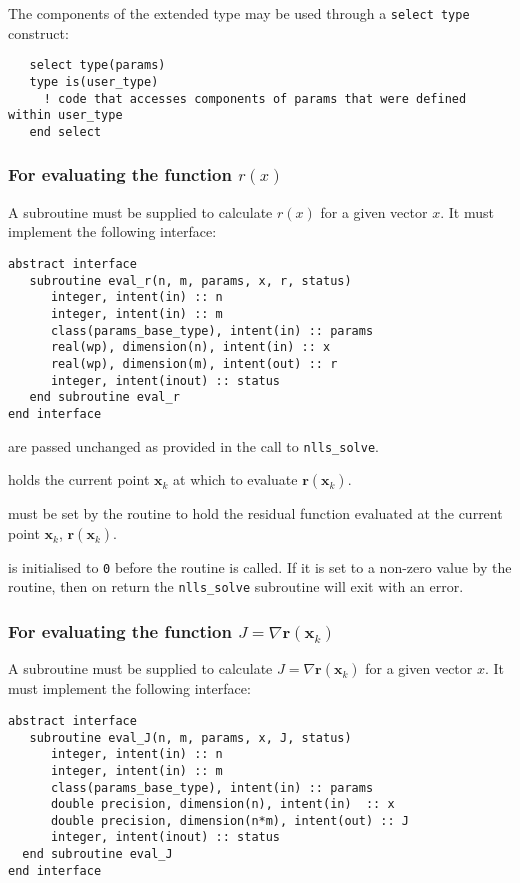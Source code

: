 \documentclass{spec}
\newcommand{\vx}{ {\bm x} } %
\newcommand{\vr}{ {\bm r} } %
\newcommand{\iter}[2][k]{ #2_{#1}^{}} %
\begin{document}
The components of the extended type may be used through a \texttt{select type}
construct:
\begin{verbatim}
   select type(params)
   type is(user_type)
     ! code that accesses components of params that were defined within user_type
   end select
\end{verbatim}

\subsubsection{For evaluating the function $r(x)$}
A subroutine must be supplied to calculate $r(x)$ for a given vector $x$. It
must implement the following interface:

\begin{verbatim}
abstract interface
   subroutine eval_r(n, m, params, x, r, status)
      integer, intent(in) :: n
      integer, intent(in) :: m
      class(params_base_type), intent(in) :: params
      real(wp), dimension(n), intent(in) :: x
      real(wp), dimension(m), intent(out) :: r
      integer, intent(inout) :: status
   end subroutine eval_r
end interface
\end{verbatim}

\begin{description}
    are passed unchanged as provided in the call to
      {\tt nlls\_solve}.

       holds the current point $\iter{\vx}$ at which to evaluate $\vr(\iter{\vx})$.

    must be set by the routine to hold the residual function
      evaluated at the current point $\iter{\vx}$, $\vr(\iter{\vx})$.

    is initialised to \texttt{0} before the routine is
      called. If it is set to a non-zero value by the routine, then on return
      the {\tt nlls\_solve} subroutine will exit with an error.
\end{description}

\subsubsection{For evaluating the function $J = \nabla \vr(\iter{\vx})$}
A subroutine must be supplied to calculate $J = \nabla \vr(\iter{\vx})$ for a given vector $x$. It
must implement the following interface:

\begin{verbatim}
abstract interface
   subroutine eval_J(n, m, params, x, J, status)
      integer, intent(in) :: n
      integer, intent(in) :: m
      class(params_base_type), intent(in) :: params
      double precision, dimension(n), intent(in)  :: x
      double precision, dimension(n*m), intent(out) :: J
      integer, intent(inout) :: status
  end subroutine eval_J
end interface
\end{verbatim}
\end{document}

